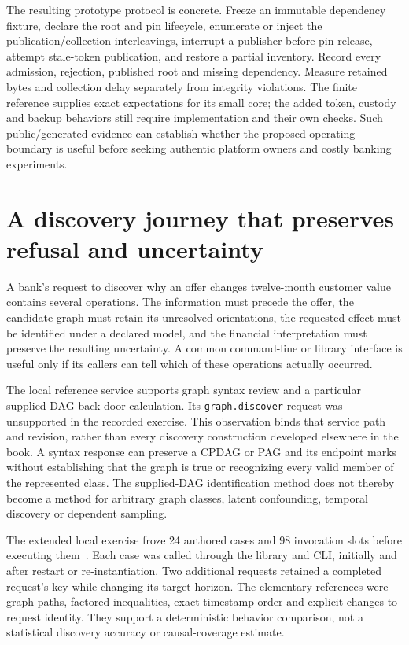 The resulting prototype protocol is concrete. Freeze an immutable dependency fixture, declare the root and pin lifecycle, enumerate or inject the publication/collection interleavings, interrupt a publisher before pin release, attempt stale-token publication, and restore a partial inventory. Record every admission, rejection, published root and missing dependency. Measure retained bytes and collection delay separately from integrity violations. The finite reference supplies exact expectations for its small core; the added token, custody and backup behaviors still require implementation and their own checks. Such public/generated evidence can establish whether the proposed operating boundary is useful before seeking authentic platform owners and costly banking experiments.
\label{exec17:i4-pins-end}


\section{A discovery journey that preserves refusal and uncertainty}
\label{exec13:discovery-journey}

A bank's request to discover why an offer changes twelve-month customer value
contains several operations. The information must precede the offer, the
candidate graph must retain its unresolved orientations, the requested effect
must be identified under a declared model, and the financial interpretation
must preserve the resulting uncertainty. A common command-line or library
interface is useful only if its callers can tell which of these operations
actually occurred.

The local reference service supports graph syntax review and a particular
supplied-DAG back-door calculation. Its \texttt{graph.discover} request was unsupported in the recorded exercise. This observation binds that service path and revision, rather than every discovery construction developed elsewhere in the book. A syntax response can preserve a CPDAG or PAG and its endpoint
marks without establishing that the graph is true or recognizing every valid
member of the represented class. The supplied-DAG identification method does
not thereby become a method for arbitrary graph classes, latent confounding,
temporal discovery or dependent sampling.

The extended local exercise froze 24 authored cases and 98 invocation slots
before executing them~\citep{exec13_discovery_journey}. Each case was called
through the library and CLI, initially and after restart or re-instantiation.
Two additional requests retained a completed request's key while changing its
target horizon. The elementary references were graph paths, factored
inequalities, exact timestamp order and explicit changes to request identity.
They support a deterministic behavior comparison, not a statistical discovery
accuracy or causal-coverage estimate.

